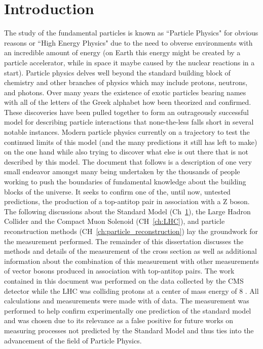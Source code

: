 \chapter{Introduction}
\label{ch:intro}     
The study of the fundamental particles is known as ``Particle Physics" for obvious reasons or ``High Energy Physics" due to the need to obverse environments with an incredible amount of energy (on Earth this energy might be created by a particle accelerator, while in space it maybe caused by the nuclear reactions in a start). Particle physics delves well beyond the standard building block of chemistry and other branches of physics which may include protons, neutrons, and photons. Over many years the existence of exotic particles bearing names with all of the letters of the Greek alphabet how been theorized and confirmed. These discoveries have been pulled together to form an outrageously successful model for describing particle interactions that none-the-less falls short in several notable instances. Modern particle physics currently on a trajectory to test the continued limits of this model (and the many predictions it still has left to make) on the one hand while also trying to discover what else is out there that is not described by this model. The document that follows is a description of one very small endeavor amongst many being undertaken by the thousands of people working to push the boundaries of fundamental knowledge about the building blocks of the universe. It seeks to confirm one of the, until now, untested predictions, the production of a top-antitop pair in association with a Z boson.	\\

The following discussions about the Standard Model (Ch~\ref{ch:intro}), the Large Hadron Collider and the Compact Muon Solenoid (CH~\ref{ch:LHC}), and particle reconstruction methods (CH~\ref{ch:particle_reconstruction}) lay the groundwork for the measurement performed. The remainder of this dissertation discusses the methods and details of the measurement of the \ttZ cross section as well as additional information about the combination of this measurement with other measurements of vector bosons produced in association with top-antitop pairs. The work contained in this document was performed on the data collected by the CMS detector while the LHC was colliding protons at a center of mass energy of 8 \TeV. All calculations and measurements were made with \intLumi of data. The measurement was performed to help confirm experimentally one prediction of the standard model and was chosen due to its relevance as a false positive for future works on measuring processes not predicted by the Standard Model and thus ties into the advancement of the field of Particle Physics.
	
